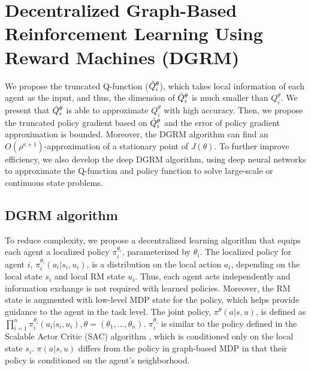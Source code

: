 \documentclass[conf]{new-aiaa}
\def\foo ABC{DGRM}
\begin{document}
\section{Decentralized Graph-Based Reinforcement Learning Using Reward Machines (DGRM)}

We propose the truncated Q-function ($\Tilde{Q}_i^\theta$), which takes local information of each agent as the input, and thus, the dimension of $\Tilde{Q}_i^\theta$ is much smaller than $Q_i^\theta$. We present that $\Tilde{Q}_i^\theta$ is able to approximate $Q_i^\theta$ with high accuracy. Then, we propose the truncated policy gradient based on $\Tilde{Q}_i^\theta$ and the error of policy gradient approximation is bounded. Moreover, the \foo ABC algorithm can find an $O(\rho^{\kappa+1})$-approximation of a stationary point of $J(\theta)$. To further improve efficiency, we also develop the deep \foo ABC algorithm, using deep neural networks to approximate the Q-function and policy function to solve large-scale or continuous state problems.



\subsection{\foo ABC algorithm}

To reduce complexity, we propose a decentralized learning algorithm that equips each agent a localized policy $\pi_i^{\theta_i}$, parameterized by $\theta_i$. The localized policy for agent $i$,  $\pi_i^{\theta_i} (a_i | s_i, u_i)$, is a distribution on the local action $a_i$, depending on the local state $s_i$ and local RM state $u_i$. Thus, each agent acts independently and information exchange is not required with learned policies. Moreover, the RM state is augmented with low-level MDP state for the policy, which helps provide guidance to the agent in the task level. The joint policy, $\pi^\theta(a|s, u)$, is defined as $\prod_{i=1}^n \pi_i^{\theta_i} (a_i|s_i, u_i), \theta = (\theta_1, \dots,\theta_n)$. $\pi_i^{\theta_i}$ is similar to the policy defined in the Scalable Actor Critic (SAC) algorithm
\cite{qu2020scalable}, which is conditioned only on the local state $s_i$. $\pi(a|s, u)$ differs from the policy in graph-based MDP \cite{cheng2013variational} in that their policy is conditioned on the agent's neighborhood. 
\end{document}
